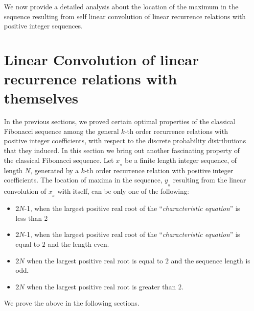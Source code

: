 \begin{multicols}{2}
\vspace{-1.3cm}

We now provide a detailed analysis about the location of the maximum in the sequence resulting from self linear convolution of linear recurrence relations with positive integer sequences.

\section{Linear Convolution of linear\\ recurrence relations with\\ themselves}\label{section-14}
In the previous sections, we proved certain optimal properties of the classical Fibonacci sequence among the general $k$-th order recurrence relations with positive integer coefficients, with respect to the discrete probability distributions that they induced. In this section we bring out another fascinating property of the classical Fibonacci sequence. Let $x_{_n}$ be a finite length integer sequence, of length $N$, generated by a $k$-th order recurrence relation with positive integer coefficients. The location of maxima in the sequence, $y_{_n}$ resulting from the linear convolution of $x_{_n}$ with itself, can be only one of the following:
\begin{itemize}
\item 2$N$-1, when the largest positive real root of the ``\textit{characteristic equation}'' is less than 2 
\item 2$N$-1, when the largest positive real root of the ``\textit{characteristic equation}'' is equal to  2 and the length even.
\item $2N$ when the largest positive real root is equal to 2 and the sequence length is odd.
\item $2N$ when the largest positive real root is greater than 2.
\end{itemize}
We prove the above in the following sections. 


\end{multicols}
